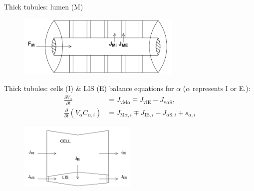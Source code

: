 \documentclass{beamer}
\begin{document}
\begin{frame}{Thick tubules: lumen (M)}
    \begin{figure}
        \centering
        \includegraphics[width=0.7\textwidth]{figures/thick_tubule.png}
    \end{figure}
\end{frame}

\begin{frame}{Thick tubules: cells (I) \& LIS (E)}
    balance equations for $\alpha$ ($\alpha$ represents I or E.):
    \begin{align}
        \frac{\partial V_{\alpha}}{\partial t} &= J_{\mathrm{vM}\alpha} \mp J_{\mathrm{vIE}}-J_{\mathrm{v}\alpha\mathrm{S}},\\
        \frac{\partial}{\partial t}\left(V_{\alpha}C_{\alpha,i}\right) &= J_{\mathrm{M}\alpha,i} \mp J_{\mathrm{IE},i}-J_{\alpha\mathrm{S},i}+s_{\alpha,i}
    \end{align}
    \begin{figure}
        \centering
        \includegraphics[width=0.5\textwidth]{figures/cell_LIS.png}
    \end{figure}
\end{frame}
\end{document}
